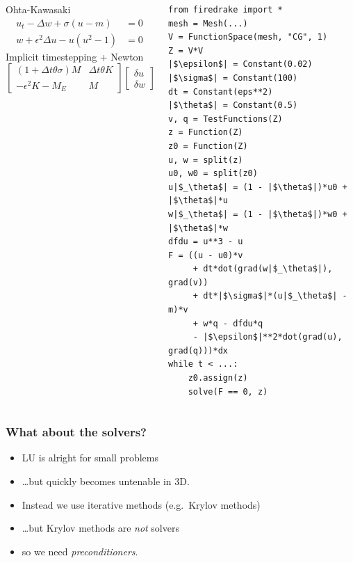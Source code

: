 \documentclass[presentation,aspectratio=43]{beamer}
\begin{document}
\begin{frame}[fragile]
  \begin{columns}
    \begin{column}{0.5\textwidth}
      \begin{block}{Ohta-Kawasaki}
        \small
        \begin{align*}
          u_t - \Delta w + \sigma(u - m) &= 0\\
          w + \epsilon^2 \Delta u - u(u^2 - 1) &= 0
        \end{align*}
        Implicit timestepping + Newton
        \begin{equation*}
          \begin{bmatrix}
            (1 + \Delta t \theta \sigma)M  & \Delta t\theta K \\
            -\epsilon^2 K - M_E & M
          \end{bmatrix}
          \begin{bmatrix}
            \delta u \\
            \delta w
          \end{bmatrix} =
          \begin{bmatrix}
            f_1 \\
            f_2
          \end{bmatrix}
        \end{equation*}
      \end{block}
    \end{column}
    \begin{column}{0.5\textwidth}
\begin{verbatim}
from firedrake import *
mesh = Mesh(...)
V = FunctionSpace(mesh, "CG", 1)
Z = V*V
|$\epsilon$| = Constant(0.02)
|$\sigma$| = Constant(100)
dt = Constant(eps**2)
|$\theta$| = Constant(0.5)
v, q = TestFunctions(Z)
z = Function(Z)
z0 = Function(Z)
u, w = split(z)
u0, w0 = split(z0)
u|$_\theta$| = (1 - |$\theta$|)*u0 + |$\theta$|*u
w|$_\theta$| = (1 - |$\theta$|)*w0 + |$\theta$|*w
dfdu = u**3 - u
F = ((u - u0)*v
     + dt*dot(grad(w|$_\theta$|), grad(v))
     + dt*|$\sigma$|*(u|$_\theta$| - m)*v
     + w*q - dfdu*q
     - |$\epsilon$|**2*dot(grad(u), grad(q)))*dx
while t < ...:
    z0.assign(z)
    solve(F == 0, z)
\end{verbatim}
    \end{column}
  \end{columns}
\end{frame}

\begin{frame}[t]
  \frametitle{What about the solvers?}
  \begin{itemize}
  \item LU is alright for small problems
  \item \dots but quickly becomes untenable in 3D.
  \item Instead we use iterative methods (e.g.~Krylov methods)
  \item<2-> \dots but Krylov methods are \emph{not} solvers
  \item<3-> so we need \emph{preconditioners}.
  \end{itemize}
\end{frame}
\end{document}
